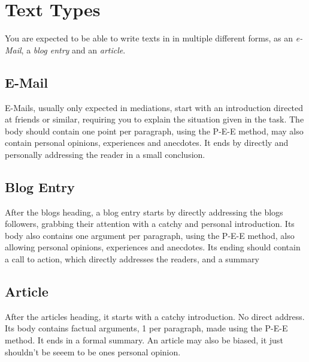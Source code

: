 \documentclass{article}
\begin{document}
\section{Text Types}
You are expected to be able to write texts in in multiple different forms, as an \emph{e-Mail}, a \emph{blog entry} and an \emph{article}.
 
\subsection{E-Mail}
E-Mails, usually only expected in mediations, start with an introduction directed at friends or similar, requiring you to explain the situation given in the task. The body should contain one point per paragraph, using the P-E-E method, may also contain personal opinions, experiences and anecdotes. It ends by directly and personally addressing the reader in a small conclusion.
 
\subsection{Blog Entry}
After the blogs heading, a blog entry starts by directly addressing the blogs followers, grabbing their attention with a catchy and personal introduction. Its body also contains one argument per paragraph, using the P-E-E method, also allowing personal opinions, experiences and anecdotes. Its ending should contain a call to action, which directly addresses the readers, and a summary
\subsection{Article}
After the articles heading, it starts with a catchy introduction. No direct address. Its body contains factual arguments, 1 per paragraph, made using the P-E-E method. It ends in a formal summary. An article may also be biased, it just shouldn't be seeem to be ones personal opinion.
 
\end{document}
